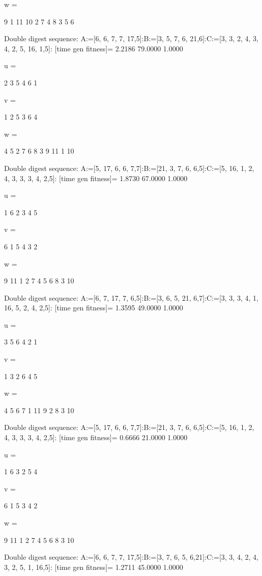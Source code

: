w =

     9     1    11    10     2     7     4     8     3     5     6

Double digest sequence:
A:=[6, 6, 7, 7, 17,5]:B:=[3, 5, 7, 6, 21,6]:C:=[3, 3, 2, 4, 3, 4, 2, 5, 16, 1,5]:
[time gen fitness]=
    2.2186   79.0000    1.0000


u =

     2     3     5     4     6     1


v =

     1     2     5     3     6     4


w =

     4     5     2     7     6     8     3     9    11     1    10

Double digest sequence:
A:=[5, 17, 6, 6, 7,7]:B:=[21, 3, 7, 6, 6,5]:C:=[5, 16, 1, 2, 4, 3, 3, 3, 4, 2,5]:
[time gen fitness]=
    1.8730   67.0000    1.0000


u =

     1     6     2     3     4     5


v =

     6     1     5     4     3     2


w =

     9    11     1     2     7     4     5     6     8     3    10

Double digest sequence:
A:=[6, 7, 17, 7, 6,5]:B:=[3, 6, 5, 21, 6,7]:C:=[3, 3, 3, 4, 1, 16, 5, 2, 4, 2,5]:
[time gen fitness]=
    1.3595   49.0000    1.0000


u =

     3     5     6     4     2     1


v =

     1     3     2     6     4     5


w =

     4     5     6     7     1    11     9     2     8     3    10

Double digest sequence:
A:=[5, 17, 6, 6, 7,7]:B:=[21, 3, 7, 6, 6,5]:C:=[5, 16, 1, 2, 4, 3, 3, 3, 4, 2,5]:
[time gen fitness]=
    0.6666   21.0000    1.0000


u =

     1     6     3     2     5     4


v =

     6     1     5     3     4     2


w =

     9    11     1     2     7     4     5     6     8     3    10

Double digest sequence:
A:=[6, 6, 7, 7, 17,5]:B:=[3, 7, 6, 5, 6,21]:C:=[3, 3, 4, 2, 4, 3, 2, 5, 1, 16,5]:
[time gen fitness]=
    1.2711   45.0000    1.0000


